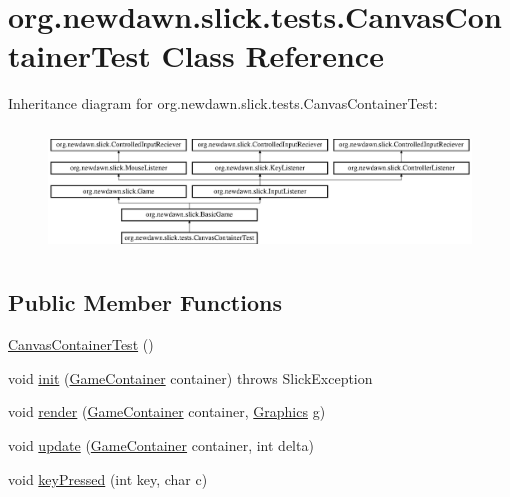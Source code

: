 \hypertarget{classorg_1_1newdawn_1_1slick_1_1tests_1_1_canvas_container_test}{}\section{org.\+newdawn.\+slick.\+tests.\+Canvas\+Container\+Test Class Reference}
\label{classorg_1_1newdawn_1_1slick_1_1tests_1_1_canvas_container_test}
Inheritance diagram for org.\+newdawn.\+slick.\+tests.\+Canvas\+Container\+Test\+:\begin{figure}[H]
\begin{center}
\leavevmode
\includegraphics[height=3.345281cm]{classorg_1_1newdawn_1_1slick_1_1tests_1_1_canvas_container_test}
\end{center}
\end{figure}
\subsection*{Public Member Functions}
\begin{DoxyCompactItemize}
\item 
\mbox{\hyperlink{classorg_1_1newdawn_1_1slick_1_1tests_1_1_canvas_container_test_a480a57af5c31bc5fdbc74ac3b52084fa}{Canvas\+Container\+Test}} ()
\item 
void \mbox{\hyperlink{classorg_1_1newdawn_1_1slick_1_1tests_1_1_canvas_container_test_a1151944f5f29cc7cddefc077543b981d}{init}} (\mbox{\hyperlink{classorg_1_1newdawn_1_1slick_1_1_game_container}{Game\+Container}} container)  throws Slick\+Exception 
\item 
void \mbox{\hyperlink{classorg_1_1newdawn_1_1slick_1_1tests_1_1_canvas_container_test_a6914f065b8661cb74a658d3a31d70766}{render}} (\mbox{\hyperlink{classorg_1_1newdawn_1_1slick_1_1_game_container}{Game\+Container}} container, \mbox{\hyperlink{classorg_1_1newdawn_1_1slick_1_1_graphics}{Graphics}} g)
\item 
void \mbox{\hyperlink{classorg_1_1newdawn_1_1slick_1_1tests_1_1_canvas_container_test_a6c511126bf46494813648fab72845c9c}{update}} (\mbox{\hyperlink{classorg_1_1newdawn_1_1slick_1_1_game_container}{Game\+Container}} container, int delta)
\item 
void \mbox{\hyperlink{classorg_1_1newdawn_1_1slick_1_1tests_1_1_canvas_container_test_ab781425b9ed6ef0de7301b513de25016}{key\+Pressed}} (int key, char c)
\end{DoxyCompactItemize}
